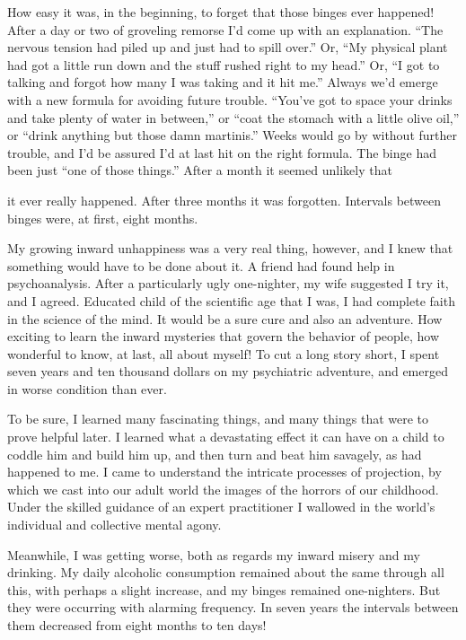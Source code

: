 \begin{biblechapter}
How easy it was, in the beginning, to forget that those binges ever happened! After a day or two of groveling remorse I’d come up with an explanation. “The nervous tension had piled up and just had to spill over.” Or, “My physical plant had got a little run down and the stuff rushed right to my head.” Or, “I got to talking and forgot how many I was taking and it hit me.” Always we’d emerge with a new formula for avoiding future trouble. “You’ve got to space your drinks and take plenty of water in between,” or “coat the stomach with a little olive oil,” or “drink anything but those damn martinis.” Weeks would go by without further trouble, and I’d be assured I’d at last hit on the right formula. The binge had been just “one of those things.” After a month it seemed unlikely that

it ever really happened. After three months it was forgotten. Intervals between binges were, at first, eight months.

My growing inward unhappiness was a very real thing, however, and I knew that something would have to be done about it. A friend had found help in psychoanalysis. After a particularly ugly one-nighter, my wife suggested I try it, and I agreed. Educated child of the scientific age that I was, I had complete faith in the science of the mind. It would be a sure cure and also an adventure. How exciting to learn the inward mysteries that govern the behavior of people, how wonderful to know, at last, all about myself! To cut a long story short, I spent seven years and ten thousand dollars on my psychiatric adventure, and emerged in worse condition than ever.

To be sure, I learned many fascinating things, and many things that were to prove helpful later. I learned what a devastating effect it can have on a child to coddle him and build him up, and then turn and beat him savagely, as had happened to me. I came to understand the intricate processes of projection, by which we cast into our adult world the images of the horrors of our childhood. Under the skilled guidance of an expert practitioner I wallowed in the world’s individual and collective mental agony.

Meanwhile, I was getting worse, both as regards my inward misery and my drinking. My daily alcoholic consumption remained about the same through all this, with perhaps a slight increase, and my binges remained one-nighters. But they were occurring with alarming frequency. In seven years the intervals between them decreased from eight months to ten days!


\end{biblechapter}
